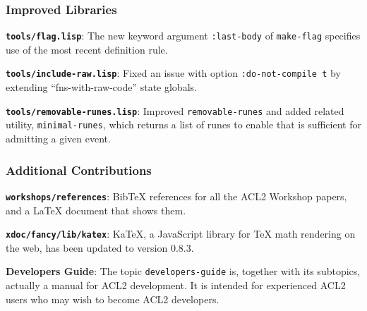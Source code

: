 \documentclass{beamer}
\newcommand{\code}[1]{\texttt{#1}}
\newcommand{\bookpath}[1]{\textbf{\code{#1}}}
\newcommand{\implibtitle}{\frametitle{Improved Libraries}}
\newcommand{\separation}{\vspace*{1ex}}
\begin{document}

\begin{frame}

\implibtitle

\bookpath{tools/flag.lisp}:
The new keyword argument \code{:last-body} of \code{make-flag}
specifies use of the most recent definition rule.

\separation

\bookpath{tools/include-raw.lisp}:
Fixed an issue with option \code{:do-not-compile t} by extending
``fns-with-raw-code'' state globals.

\separation

\bookpath{tools/removable-runes.lisp}:
Improved \code{removable-runes} and added related utility,
\code{minimal-runes}, which returns a list of runes to enable that is
sufficient for admitting a given event.

\end{frame}


\begin{frame}

\frametitle{Additional Contributions}

\bookpath{workshops/references}:
BibTeX references for all the ACL2 Workshop papers,
and a LaTeX document that shows them.

\separation

\bookpath{xdoc/fancy/lib/katex}:
KaTeX, a JavaScript library for TeX math rendering on the web,
has been updated to version 0.8.3.

\separation

\textbf{Developers Guide}:
The topic \code{developers-guide} is, together with its subtopics, actually a
manual for ACL2 development.  It is intended for experienced ACL2
users who may wish to become ACL2 developers.

\end{frame}

\end{document}
